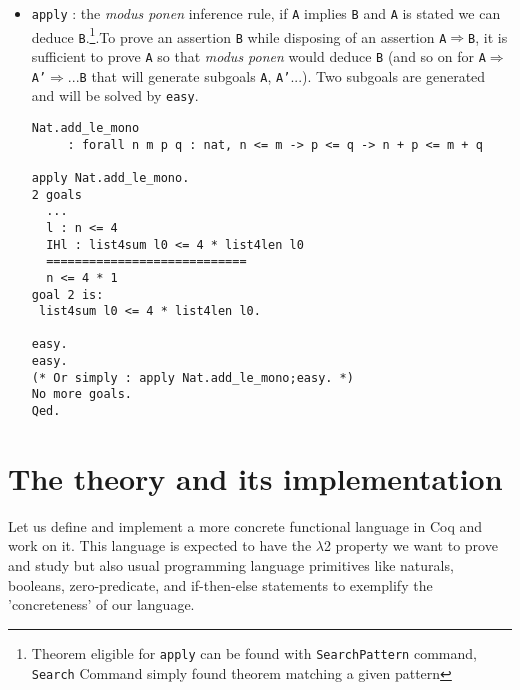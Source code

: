 \documentclass{article}
\begin{document}
\begin{itemize}
\begin{verbatim}
rewrite Nat.mul_add_distr_l.
  ...
  ============================
  n + list4sum l0 <= 4 * 1 + 4 * list4len l0\end{verbatim}
            \item \texttt{apply} : the \textit{modus ponen} inference rule, if \texttt{A} implies \texttt{B} and \texttt{A} is stated we can deduce \texttt{B}.\footnote{Theorem eligible for \texttt{apply} can be found with \texttt{SearchPattern} command, \texttt{Search} Command simply found theorem matching a given pattern}.To prove an assertion \texttt{B} while disposing of an assertion \texttt{A}$\Rightarrow$\texttt{B}, it is sufficient to prove \texttt{A} so that \textit{modus ponen} would deduce \texttt{B} (and so on for \texttt{A}$\Rightarrow$\texttt{A'}$\Rightarrow$...\texttt{B} that will generate subgoals \texttt{A}, \texttt{A'}...). Two subgoals are generated and will be solved by \texttt{easy}.
            \begin{verbatim}Nat.add_le_mono
     : forall n m p q : nat, n <= m -> p <= q -> n + p <= m + q
     
apply Nat.add_le_mono.
2 goals
  ...
  l : n <= 4
  IHl : list4sum l0 <= 4 * list4len l0
  ============================
  n <= 4 * 1
goal 2 is:
 list4sum l0 <= 4 * list4len l0.

easy.
easy.
(* Or simply : apply Nat.add_le_mono;easy. *)
No more goals.
Qed. \end{verbatim}
        \end{itemize}
        
\section{The theory and its implementation}
    Let us define and implement a more concrete functional language in Coq and work on it. This language is expected to have the $\lambda$2 property we want to prove and study but also usual programming language primitives like naturals, booleans, zero-predicate, and if-then-else statements to exemplify the 'concreteness' of our language.
    
\end{document}
